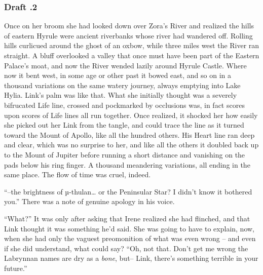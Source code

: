 \documentclass[../FGP.tex]{subfiles}
\begin{document}
\begin{fragment}
\subsubsection{Draft \thefragment.2}
Once on her broom she had looked down over Zora's River and realized the hills of eastern Hyrule were ancient riverbanks whose river had wandered off.%
Rolling hills curlicued around the ghost of an oxbow, while three miles west the River ran straight. A bluff overlooked a valley that once must have been part of the Eastern Palace's moat, and now the River wended lazily around Hyrule Castle. Where now it bent west, in some age or other past it bowed east, and so on in a thousand variations on the same watery journey, always emptying into Lake Hylia. Link's palm was like that. What she initially thought was a severely bifrucated Life line, crossed and pockmarked by occlusions was, in  fact scores upon scores of Life lines all run together. Once realized, it shocked her how easily she picked out her Link%
    \reversemarginpar{}
from the tangle, and could trace the line as it turned toward the Mount of Apollo, like all the hundred others. His Heart line ran deep and clear, which was no surprise to her, and like all the others it doubled back up to the Mount of Jupiter before running a short distance and vanishing on the pads below his ring finger. A thousand meandering variations, all ending in the same place. The flow of time was cruel, indeed.

``--the brightness of {\Gr µ}-thulan\ldots{} or the Peninsular Star? I didn't know it bothered you.'' There was a note of genuine apology in his voice.

``What?'' It was only after asking that Irene realized she had flinched, and that Link thought it was something he'd said. She was going to have to explain, now, when she had only the vaguest preomonition of what was even wrong -- and even if she did understand, what could say? ``Oh, not that. Don't get me wrong the Labrynnan names are dry as a \emph{bone}, but-- Link, there's something terrible in your future.''  


\end{fragment}
\end{document}
